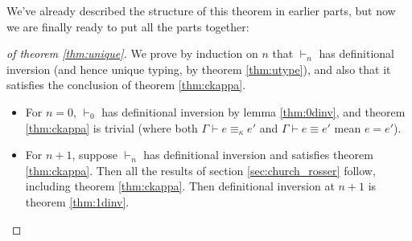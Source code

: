 We've already described the structure of this theorem in earlier parts, but now we are finally ready to put all the parts together:

\begin{proof}[of theorem \ref{thm:unique}]
We prove by induction on $n$ that $\vdash_n$ has definitional inversion (and hence unique typing, by theorem \ref{thm:utype}), and also that it satisfies the conclusion of theorem \ref{thm:ckappa}.
\begin{itemize}
\item For $n=0$, $\vdash_0$ has definitional inversion by lemma \ref{thm:0dinv}, and theorem \ref{thm:ckappa} is trivial (where both $\Gamma\vdash e\equiv_\kappa e'$ and $\Gamma\vdash e\equiv e'$ mean $e=e'$).
\item For $n+1$, suppose $\vdash_n$ has definitional inversion and satisfies theorem \ref{thm:ckappa}. Then all the results of section \ref{sec:church_rosser} follow, including theorem \ref{thm:ckappa}. Then definitional inversion at $n+1$ is theorem \ref{thm:1dinv}.
\end{itemize}
\end{proof}
